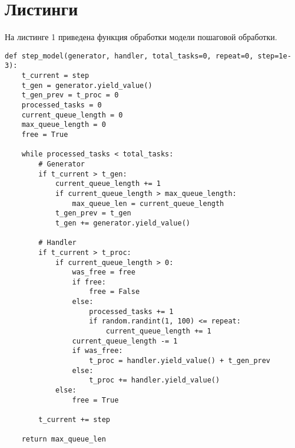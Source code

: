 \section*{Листинги}



На листинге 1 приведена функция обработки модели пошаговой обработки.
\begin{lstlisting}[label=CodeStand,caption=Реализация пошагового подхода]
def step_model(generator, handler, total_tasks=0, repeat=0, step=1e-3):
	t_current = step
	t_gen = generator.yield_value()
	t_gen_prev = t_proc = 0
	processed_tasks = 0
	current_queue_length = 0
	max_queue_length = 0
	free = True
	
	while processed_tasks < total_tasks:
		# Generator
		if t_current > t_gen:
			current_queue_length += 1
			if current_queue_length > max_queue_length:
				max_queue_len = current_queue_length
			t_gen_prev = t_gen
			t_gen += generator.yield_value()
		
		# Handler
		if t_current > t_proc:
			if current_queue_length > 0:
				was_free = free
				if free:
					free = False
				else:
					processed_tasks += 1
					if random.randint(1, 100) <= repeat:
						current_queue_length += 1
				current_queue_length -= 1
				if was_free:
					t_proc = handler.yield_value() + t_gen_prev
				else:
					t_proc += handler.yield_value()
			else:
				free = True
		
		t_current += step
	
	return max_queue_len
\end{lstlisting}



